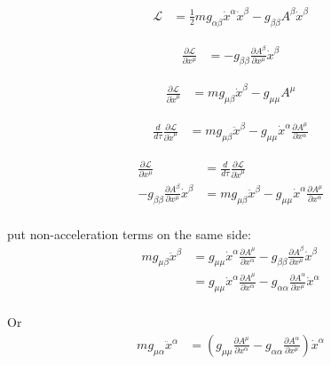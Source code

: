 \documentclass{article}      %
\newcommand{\inv}[1]{\frac{1}{#1}}
\newcommand{\LL}[0]{\mathcal{L}}
\newcommand{\xdot}[0]{\dot{x}}
\newcommand{\xddot}[0]{\ddot{x}}
\newcommand{\PD}[2]{\frac{\partial {#2}}{\partial {#1}}}
\begin{document}

%
%

\begin{align*}
\LL &= \inv{2} m g_{\alpha \beta} \xdot^\alpha \xdot^\beta - g_{\beta \beta} A^\beta \xdot^\beta
\end{align*}

\begin{align*}
\PD{x^\mu}{\LL} &= -g_{\beta \beta} \PD{x^\mu}{A^\beta} \xdot^\beta
\end{align*}

\begin{align*}
\PD{\xdot^\mu}{\LL} &= m g_{\mu \beta} \xdot^\beta - g_{\mu \mu} A^\mu
\end{align*}

\begin{align*}
\frac{d}{d\tau} \PD{\xdot^\mu}{\LL} &= 
m g_{\mu \beta} \xddot^\beta - g_{\mu \mu} \xdot^\alpha \PD{x^\alpha}{A^\mu}
\end{align*}

\begin{align*}
\PD{x^\mu}{\LL} &= \frac{d}{d\tau} \PD{\xdot^\mu}{\LL} \\
-g_{\beta \beta} \PD{x^\mu}{A^\beta} \xdot^\beta &= m g_{\mu \beta} \xddot^\beta - g_{\mu \mu} \xdot^\alpha \PD{x^\alpha}{A^\mu} \\
\end{align*}

 put non-acceleration terms on the same side:
\begin{align*}
m g_{\mu \beta} \xddot^\beta
&= g_{\mu \mu} \xdot^\alpha \PD{x^\alpha}{A^\mu} -g_{\beta \beta} \PD{x^\mu}{A^\beta} \xdot^\beta \\
&= g_{\mu \mu} \xdot^\alpha \PD{x^\alpha}{A^\mu} -g_{\alpha \alpha} \PD{x^\mu}{A^\alpha} \xdot^\alpha \\
\end{align*}

Or
\begin{align*}
m g_{\mu \alpha} \xddot^\alpha &= \left( g_{\mu \mu} \PD{x^\alpha}{A^\mu} -g_{\alpha \alpha} \PD{x^\mu}{A^\alpha} \right) \xdot^\alpha \\
\end{align*}

\end{document}

